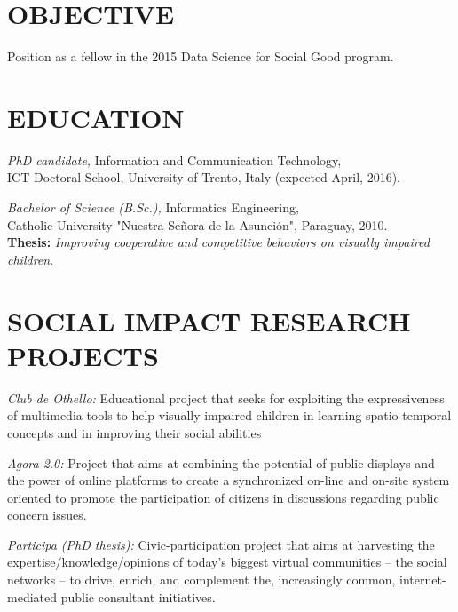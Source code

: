 \documentclass[line,margin]{res}
\begin{document}

\address{Via delle Cave 13, Trento, Italy}
\address{jorgesaldivar@gmail.com}

\begin{resume}
 
\section{OBJECTIVE} Position as a fellow in the 2015 Data Science for Social Good program. 
 
\section{EDUCATION} 
	{\sl PhD candidate,} Information and Communication Technology,\\ 
ICT Doctoral School, University of Trento, Italy (expected April, 2016).
                
	{\sl Bachelor of Science (B.Sc.),} Informatics Engineering,\\ 
    Catholic University "Nuestra Se\~nora de la Asunci\'on", Paraguay, 2010.\\
    {\bf Thesis:} \emph{Improving cooperative and competitive behaviors on visually impaired children}.
 
\section{SOCIAL IMPACT RESEARCH PROJECTS}
	{\sl Club de Othello:} Educational project that seeks for exploiting the expressiveness of multimedia tools to help visually-impaired children in learning spatio-temporal concepts and in improving their social abilities
	
	{\sl Agora 2.0:} Project that aims at combining the potential of public displays and the power of online platforms to create a synchronized on-line and on-site system oriented to promote the participation of citizens in discussions regarding public concern issues.
	
	{\sl Participa (PhD thesis):} Civic-participation project that aims at harvesting the expertise/knowledge/opinions of today's biggest virtual communities -- the social networks -- to drive, enrich, and complement the, increasingly common, internet-mediated public consultant initiatives.
	
 

\end{resume}
\end{document}
